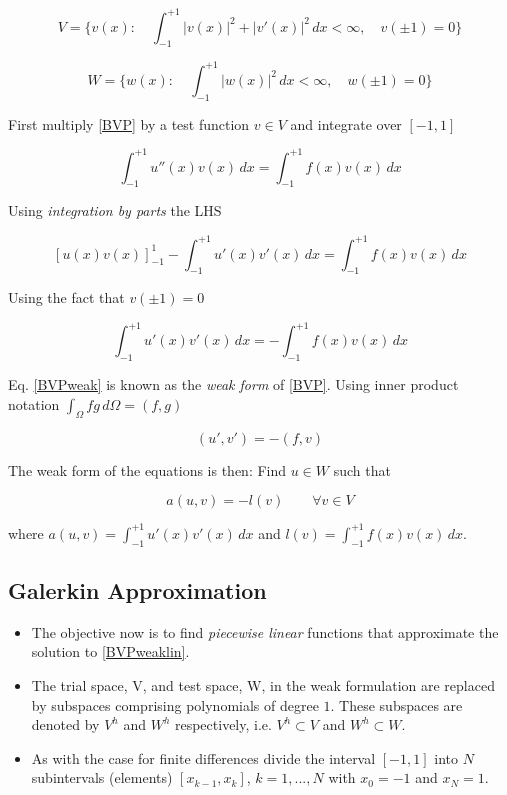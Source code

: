 \documentclass[12pt]{report}
\begin{document}
\begin{equation}\label{Vspace}
V=\Bigg\{v(x):\quad\int_{-1}^{+1}|v(x)|^2+|v'(x)|^2\,dx<\infty, \quad v(\pm{1})=0\Bigg\}
\end{equation}


\begin{equation}\label{Wspace}
W=\Bigg\{w(x):\quad\int_{-1}^{+1}|w(x)|^2\,dx<\infty, \quad w(\pm{1})=0\Bigg\}
\end{equation}


First multiply \eqref{BVP} by a test function $v\in{V}$ and integrate over $[-1,1]$

\begin{equation}\label{BVPtest}
\int_{-1}^{+1}u''(x)v(x)\,dx=\int_{-1}^{+1}f(x)v(x)\,dx
\end{equation}

Using \textit{integration by parts} the LHS

\begin{equation}\label{BVPparts}
[u(x)v(x)]^1_{-1}-\int_{-1}^{+1}u'(x)v'(x)\,dx=\int_{-1}^{+1}f(x)v(x)\,dx
\end{equation}

Using the fact that $v(\pm{1})=0$  

\begin{equation}\label{BVPweak}
\int_{-1}^{+1}u'(x)v'(x)\,dx=-\int_{-1}^{+1}f(x)v(x)\,dx
\end{equation}

Eq. \eqref{BVPweak} is known as the \textit{weak form} of \eqref{BVP}. Using inner product notation $\int_{\Omega}fg\,d\Omega=(f,g)$

\begin{equation}
(u',v')=-(f,v)
\end{equation}

The weak form of the equations is then: Find $u\in{W}$ such that 

\begin{equation}\label{BVPweaklin}
a(u,v)=-l(v)\qquad\forall{v\in{V}}
\end{equation}

where $a(u,v)=\int_{-1}^{+1}u'(x)v'(x)\,dx$ and $l(v)=\int_{-1}^{+1}f(x)v(x)\,dx$.


\subsection*{Galerkin Approximation}
\begin{itemize}
\item The objective now is to find \textit{piecewise linear} functions that approximate the solution to \eqref{BVPweaklin}.
\item  The trial space, V, and test space, W, in the weak formulation
are replaced by subspaces comprising polynomials of degree $1$. These subspaces are denoted by $V^h$ and $W^h$ respectively, i.e. $V^h⊂V$ and $W^h⊂W$.
\item As with the case for finite differences divide the interval $[−1, 1]$ into $N$ subintervals (elements) $[x_{k−1} , x_k]$, $k = 1, . . . , N$ with $x_0=−1$ and $x_N = 1$.
\end{itemize}
\end{document}
